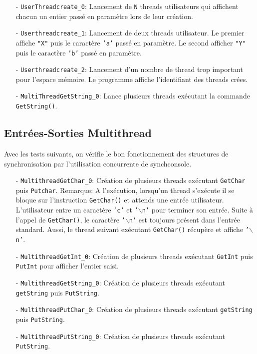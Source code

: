 \documentclass[11pt]{article}
\begin{document}
\begin{itemize}
\item[-] \texttt{UserThreadcreate\_0}: Lancement de \texttt{N} threads utilisateurs qui affichent chacun un entier passé en paramètre lors de leur
  création.
\item[-] \texttt{Userthreadcreate\_1}: Lancement de deux threads utilisateur. Le premier affiche \texttt{"X"} puis le caractère \texttt{'a'} passé en paramètre.
  Le second afficher \texttt{"Y"} puis le caractère \texttt{'b'} passé en paramètre.
\item[-] \texttt{Userthreadcreate\_2}: Lancement d'un nombre de thread trop important pour l'espace mémoire.
  Le programme affiche l'identifiant des threads crées.
\item[-] \texttt{MultiThreadGetString\_0}: Lance plusieurs threads exécutant la commande \texttt{GetString()}.
\end{itemize}

\subsection{Entrées-Sorties Multithread}
 Avec les tests suivants, on vérifie le bon fonctionnement des structures de synchronisation par l'utilisation
  concurrente de synchconsole.
\begin{itemize}
\item[-] \texttt{MultithreadGetChar\_0}: Création de plusieurs threads exécutant \texttt{GetChar}
  puis \texttt{Putchar}.
  Remarque:
  A l'exécution, lorsqu'un thread s'exécute il se bloque sur l'instruction \texttt{GetChar()} et attends une
  entrée utilisateur. L'utilisateur entre un caractère \texttt{'c'} et \texttt{'$\backslash$n'} pour terminer son entrée.
  Suite à l'appel de \texttt{GetChar()}, le caractère \texttt{'$\backslash$n'} est toujours
  présent dans l'entrée standard. Aussi, le thread suivant exécutant \texttt{GetChar()} récupère et
  affiche \texttt{'$\backslash$n'}.
\item[-] \texttt{MultithreadGetInt\_0}: Création de plusieurs threads exécutant \texttt{GetInt}
  puis \texttt{PutInt} pour afficher l'entier saisi.
\item[-] \texttt{MultithreadGetString\_0}: Création de plusieurs threads exécutant
  \texttt{getString} puis \texttt{PutString}.
\item[-] \texttt{MultithreadPutChar\_0}: Création de plusieurs threads exécutant \texttt{getString}
  puis \texttt{PutString}.
\item[-] \texttt{MultithreadPutString\_0}: Création de plusieurs threads exécutant \texttt{PutString}.
\end{itemize}
\end{document}
